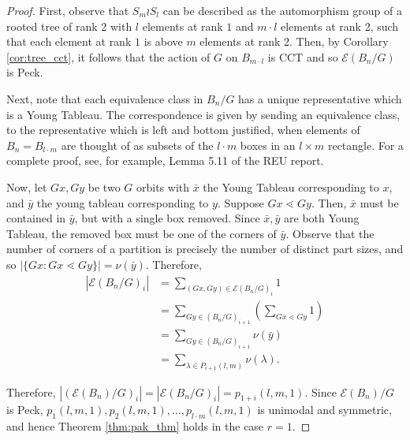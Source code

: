 \documentclass[smallextended, envcountsame, numbook]{svjour3}
\numberwithin{equation}{section}
\begin{document}
\begin{proof}

First, observe that $S_m \wr S_l$ can be described as the automorphism group of a rooted tree of rank 2 with $l$ elements at rank $1$ and $m\cdot l$ elements at rank 2, such that each element at rank $1$ is above $m$ elements at rank 2. Then, by Corollary \ref{cor:tree_cct}, it follows that the action of $G$ on $B_{m \cdot l}$ is CCT and so $\mathcal E(B_n/G)$ is Peck.

Next, note that each equivalence class in $B_n/G$ has a unique representative which is a Young Tableau. The correspondence is given by sending an equivalence class, to the representative which is left and bottom justified, when elements of $B_n = B_{l \cdot m}$ are thought of as subsets of the $l \cdot m$ boxes in an $l \times m$ rectangle. For a complete proof, see, for example, Lemma 5.11 of the REU report.

Now, let $Gx,Gy$ be two $G$ orbits with $\bar x$ the Young Tableau corresponding to $x$, and $\bar y$ the young tableau corresponding to $y$. Suppose $Gx \lessdot Gy$. Then, $\bar x$ must be contained in $\bar y$, but with a single box removed. Since $\bar x,\bar y$ are both Young Tableau, the removed box must be one of the corners of $\bar y$. Observe that the number of corners of a partition is precisely the number of distinct part sizes, and so $|\{Gx\colon Gx \lessdot Gy\}| = \nu(\bar y)$. Therefore,
\begin{align*}
  |\mathcal E(B_n/G)_i| &= \sum_{(Gx,Gy) \in \mathcal E(B_n/G)_i} 1 
  \\
  &= \sum_{Gy \in (B_n/G)_{i+1}} \left(\sum_{Gx \lessdot Gy}^{} 1 \right) 
  \\
  &= \sum_{Gy \in (B_n/G)_{i+1}}\nu(\bar y) 
  \\
  &=  \sum_{\lambda \in P_{i+1}(l,m)} \nu(\lambda).
\end{align*}

Therefore, $|(\mathcal E(B_n)/G)_i| = |\mathcal E(B_n/G)_i| = p_{1+i}(l,m,1)$. Since $\mathcal E(B_n)/G$ is Peck,
\linebreak
$p_1(l,m,1), p_{2}(l,m,1),\ldots, p_{l\cdot m}(l,m,1)$ is unimodal and symmetric, and hence Theorem \ref{thm:pak_thm} holds in the case $r = 1$.
\end{proof}
\end{document}
